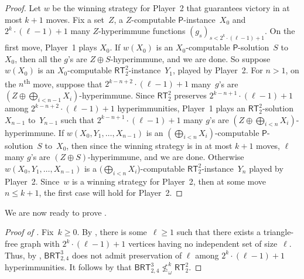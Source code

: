 \documentclass{article}
\newcommand{\Psf}{\mathsf{P}}
\newcommand{\RT}[0]{\mathsf{RT}}
\newcommand{\BRT}[0]{\mathsf{BRT}}
\numberwithin{theorem}{section}
\newtheorem{proposition}[theorem]{Proposition}
\begin{document}
\begin{proof}
Let $w$ be the winning strategy for Player~2 that guarantees victory in at most $k+1$ moves.
Fix a set~$Z$, a $Z$-computable $\Psf$-instance~$X_0$ and $2^k \cdot (\ell-1)+1$ many $Z$-hyperimmune functions $(g_s)_{s < 2^k \cdot (\ell-1)+1}$. On the first move, Player~1 plays $X_0$. If $w(X_0)$ is an $X_0$-computable $\Psf$-solution~$S$ to~$X_0$, then all the $g$'s are $Z \oplus S$-hyperimmune, and we are done. So suppose $w(X_0)$ is an $X_0$-computable $\RT^2_2$-instance~$Y_1$, played by Player~2.
For $n > 1$, on the $n$\textsuperscript{th} move, suppose that $2^{k-n+2} \cdot (\ell-1)+1$ many~$g$'s are $(Z \oplus \bigoplus_{i < n-1} X_i)$-hyperimmune. Since $\RT^2_2$ preserves $2^{k-n+1} \cdot (\ell-1)+1$ among $2^{k-n+2} \cdot (\ell-1)+1$ hyperimmunities, Player~1 plays an $\RT^2_2$-solution~$X_{n-1}$ to~$Y_{n-1}$ such that $2^{k-n+1} \cdot (\ell-1)+1$ many $g$'s are $(Z \oplus \bigoplus_{i < n} X_i)$-hyperimmune. If $w(X_0,Y_1,\dots, X_{n-1})$ is an $(\bigoplus_{i < n} X_i)$-computable $\Psf$-solution~$S$ to~$X_0$, then since the winning strategy is in at most $k+1$ moves, $\ell$ many $g$'s are $(Z \oplus S)$-hyperimmune, and we are done. Otherwise $w(X_0,Y_1,\dots, X_{n-1})$ is a $(\bigoplus_{i < n} X_i$)-computable $\RT^2_2$-instance~$Y_n$ played by Player~2. 
Since~$w$ is a winning strategy for Player~2, then at some move $n \leq k+1$, the first case will hold for Player~2.
\end{proof}

We are now ready to prove .


\begin{proof}[Proof of ]
Fix~$k \geq 0$. By , there is some~$\ell \geq 1$ such that there exists a triangle-free graph with $2^k \cdot (\ell-1)+1$ vertices having no independent set of size~$\ell$. Thus, by , $\BRT^3_{2,4}$ does not admit preservation of $\ell$ among $2^k \cdot (\ell-1)+1$ hyperimmunities. It follows by  that $\BRT^3_{2,4} \not \leq_\omega^k \RT^2_2$.
\end{proof}
\end{document}
